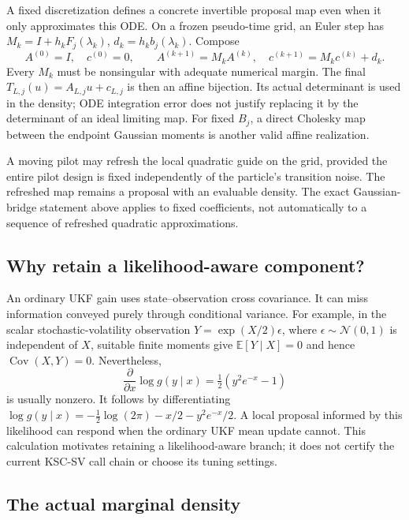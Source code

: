 \documentclass[11pt,a4paper]{article}
\newcommand{\E}{\mathbb E}
\newcommand{\Cov}{\operatorname{Cov}}
\newcommand{\Ncal}{\mathcal N}
\begin{document}
A fixed discretization defines a concrete invertible proposal map even
when it only approximates this ODE. On a frozen pseudo-time grid, an Euler
step has \(M_k=I+h_kF_j(\lambda_k)\), \(d_k=h_kb_j(\lambda_k)\).
Compose
\begin{equation}
\label{eq:affine-composition}
 A^{(0)}=I,\quad c^{(0)}=0,\qquad
 A^{(k+1)}=M_kA^{(k)},\quad
 c^{(k+1)}=M_kc^{(k)}+d_k .
\end{equation}
Every \(M_k\) must be nonsingular with adequate numerical margin.
The final \(T_{L,j}(u)=A_{L,j}u+c_{L,j}\) is then an affine bijection.
Its actual determinant is used in the density; ODE integration error
does not justify replacing it by the determinant of an ideal limiting map.
For fixed \(B_j\), a direct Cholesky map between the endpoint Gaussian
moments is another valid affine realization.

A moving pilot may refresh the local quadratic guide on the grid, provided
the entire pilot design is fixed independently of the particle's transition
noise. The refreshed map remains a proposal with an evaluable density.
The exact Gaussian-bridge statement above applies to fixed coefficients,
not automatically to a sequence of refreshed quadratic approximations.

\subsection{Why retain a likelihood-aware component?}

An ordinary UKF gain uses state--observation cross covariance. It can miss
information conveyed purely through conditional variance. For example, in
the scalar stochastic-volatility observation
\(Y=\exp(X/2)\epsilon\), where \(\epsilon\sim\Ncal(0,1)\) is independent
of \(X\), suitable finite moments give
\(\E[Y\mid X]=0\) and hence \(\Cov(X,Y)=0\).
Nevertheless,
\begin{equation}
\label{eq:sv-score}
 \frac{\partial}{\partial x}\log g(y\mid x)
 =\tfrac12(y^2e^{-x}-1)
\end{equation}
is usually nonzero. It follows by differentiating
\(\log g(y\mid x)=-\tfrac12\log(2\pi)-x/2-y^2e^{-x}/2\).
A local proposal informed by this likelihood can respond when the
ordinary UKF mean update cannot. This calculation motivates retaining a
likelihood-aware branch; it does not certify the current KSC-SV call chain
or choose its tuning settings.

\subsection{The actual marginal density}
\end{document}
